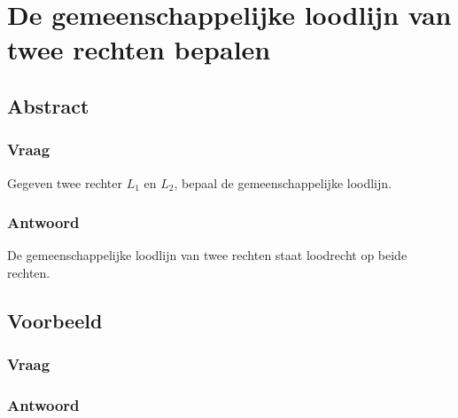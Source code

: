 \documentclass[main.tex]{subfiles}
\begin{document}
\newpage
\section{De gemeenschappelijke loodlijn van twee rechten bepalen}
\subsection{Abstract}
\subsubsection{Vraag}
\begin{center}
  Gegeven twee rechter $L_{1}$ en $L_{2}$, bepaal de gemeenschappelijke loodlijn.
\end{center}

\subsubsection{Antwoord}
De gemeenschappelijke loodlijn van twee rechten staat loodrecht op beide rechten.


\subsection{Voorbeeld}
\subsubsection{Vraag}
\subsubsection{Antwoord}

 
\end{document}
